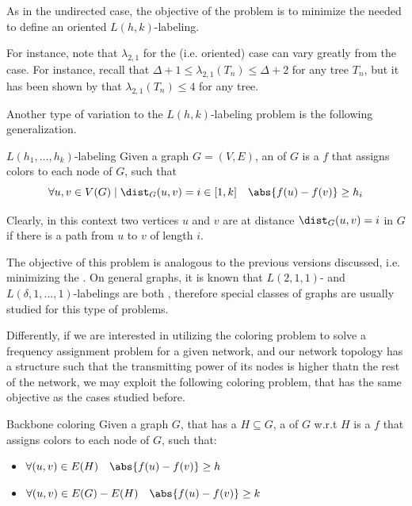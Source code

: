 \documentclass[a4paper, 12pt]{report}
\begin{document}
    As in the undirected case, the objective of the problem is to minimize the  needed to define an oriented $L(h,k)$-labeling.

    For instance, note that $\lambda_{2,1}$ for the  (i.e. oriented) case can vary greatly from the  case. For instance, recall that $\Delta + 1 \le \lambda_{2,1}(T_n) \le \Delta + 2$ for any  tree $T_n$, but it has been shown by \textcite{chang2} that $\lambda_{2,1}(T_n) \le 4$ for any  tree.

    Another type of variation to the $L(h,k)$-labeling problem is the following generalization.

    \begin{frameddefn}{$L(h_1, \ldots, h_k)$-labeling}
        Given a  graph $G= (V, E)$, an  of $G$ is a  $f$ that assigns colors to each node of $G$, such that $$\forall u, v \in V(G) \mid \dist_G(u, v) = i \in [1,k] \quad \abs{f(u) - f(v)} \ge h_i$$
    \end{frameddefn}

    Clearly, in this context two vertices $u$ and $v$ are at distance $\dist_G(u,v) = i$ in $G$ if there is a path from $u$ to $v$ of length $i$.

    The objective of this problem is analogous to the previous versions discussed, i.e. minimizing the . On general graphs, it is known that $L(2,1,1)$- and $L(\delta, 1, \ldots, 1)$-labelings are both \NPHard, therefore special classes of graphs are usually studied for this type of problems.

    Differently, if we are interested in utilizing the coloring problem to solve a frequency assignment problem for a given network, and our network topology has a  structure such that the transmitting power of its nodes is higher thatn the rest of the network, we may exploit the following coloring problem, that has the same objective as the cases studied before.

    \begin{frameddefn}{Backbone coloring}
        Given a graph $G$, that has a  $H \subseteq G$, a  of $G$ w.r.t $H$ is a  $f$ that assigns colors to each node of $G$, such that:

        \begin{itemize}
            \item $\forall (u, v) \in E(H) \quad \abs{f(u) - f(v)} \ge h$
            \item $\forall (u, v) \in E(G) - E(H) \quad \abs{f(u) - f(v)} \ge k$
        \end{itemize}
    \end{frameddefn}
\end{document}

